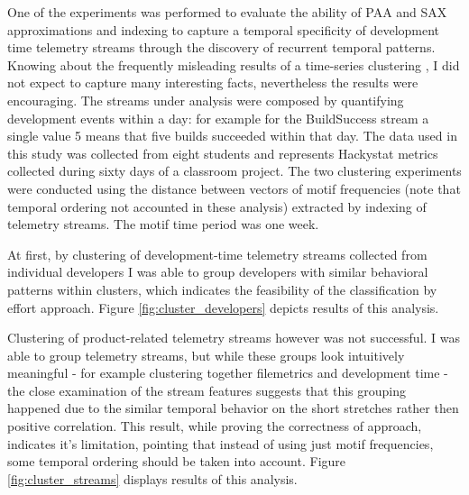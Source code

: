 \documentclass{sig-alternate}
\begin{document}
One of the experiments was performed to evaluate the ability of PAA and SAX approximations and indexing to capture a temporal specificity of development time telemetry streams through the discovery of recurrent temporal patterns. Knowing about the frequently misleading results of a time-series clustering \cite{citeulike:227029}, I did not expect to capture many interesting facts, nevertheless the results were encouraging. The streams under analysis were composed by quantifying development events within a day: for example for the BuildSuccess stream a single value 5 means that five builds succeeded within that day. The data used in this study was collected from eight students and represents Hackystat metrics collected during sixty days of a classroom project. The two clustering experiments were conducted using the distance between vectors of motif frequencies (note that temporal ordering not accounted in these analysis) extracted by indexing of telemetry streams. The motif time period was one week.

At first, by clustering of development-time telemetry streams collected from individual developers I was able to group developers with similar behavioral patterns within clusters, which indicates the feasibility of the classification by effort approach. Figure \ref{fig:cluster_developers} depicts results of this analysis.

Clustering of product-related telemetry streams however was not successful. I was able to group telemetry streams, but while these groups look intuitively meaningful - for example clustering together filemetrics and development time - the close examination of the stream features suggests that this grouping happened due to the similar temporal behavior on the short stretches rather then positive correlation. This result, while proving the correctness of approach, indicates it's limitation, pointing that instead of using just motif frequencies, some temporal ordering should be taken into account. Figure \ref{fig:cluster_streams} displays results of this analysis.
\end{document}
